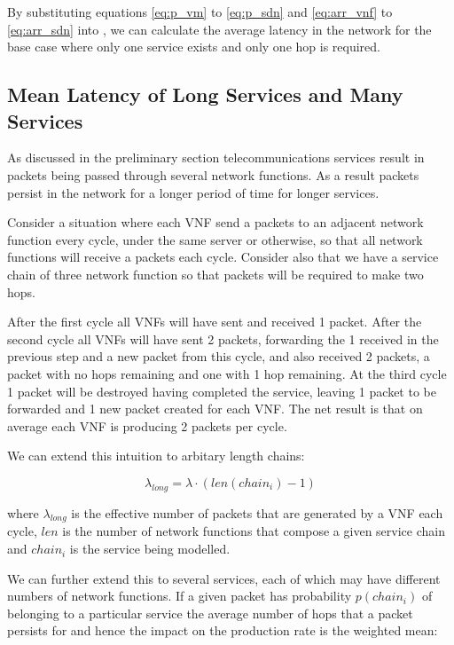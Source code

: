 By substituting equations \ref{eq:p_vm} to \ref{eq:p_sdn} and \ref{eq:arr_vnf} to \ref{eq:arr_sdn} into , we can calculate the average latency in the network for the base case where only one service exists and only one hop is required.

\subsection{Mean Latency of Long Services and Many Services}
As discussed in the preliminary section telecommunications services result in packets being passed through several network functions. As a result packets persist in the network for a longer period of time for longer services.

Consider a situation where each VNF send a packets to an adjacent network function every cycle, under the same server or otherwise, so that all network functions will receive a packets each cycle. Consider also that we have a service chain of three network function so that packets will be required to make two hops. 

After the first cycle all VNFs will have sent and received 1 packet. After the second cycle all VNFs will have sent 2 packets, forwarding the 1 received in the previous step and a new packet from this cycle, and also received 2 packets, a packet with no hops remaining and one with 1 hop remaining. At the third cycle 1 packet will be destroyed having completed the service, leaving 1 packet to be forwarded and 1 new packet created for each VNF. The net result is that on average each VNF is producing 2 packets per cycle.

We can extend this intuition to arbitary length chains:

\begin{equation}
\lambda_{long} = \lambda \cdot (len(chain_i) - 1)
\end{equation}

where $\lambda_{long}$ is the effective number of packets that are generated by a VNF each cycle, $len$ is the number of network functions that compose a given service chain and $chain_i$ is the service being modelled.

We can further extend this to several services, each of which may have different numbers of network functions. If a given packet has probability $p(chain_i)$ of belonging to a particular service the average number of hops that a packet persists for and hence the impact on the production rate is the weighted mean:

